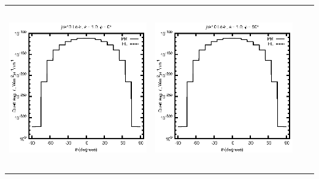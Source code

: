 \documentclass[10pt,a4paper]{article}
\begin{document}
\begin{adjustwidth}{-1.2in}{-1.2in}
\begin{tabular}{c c c c}
\includegraphics[height=7cm]{../eps/jok10_Ld_ir_fwd.eps} &
\includegraphics[height=7cm]{../eps/jok10_Ld_ir_cross.eps} \\
\end{tabular}

\pagebreak


\end{adjustwidth}
\end{document}
